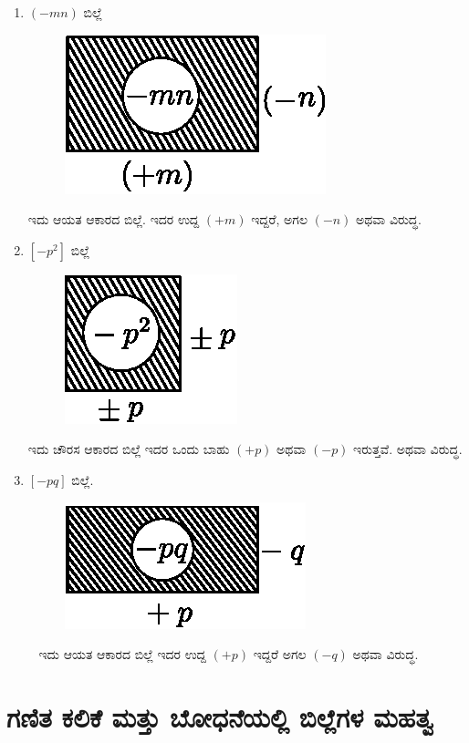 \begin{enumerate}
\item $(-mn)$ ಬಿಲ್ಲೆ 
\begin{figure}[H]
\centering
\includegraphics[scale=0.8]{src/figure/chap3/fig3-5d.eps}
\end{figure}
ಇದು ಆಯತ ಆಕಾರದ ಬಿಲ್ಲೆ. ಇದರ ಉದ್ದ $(+m)$ ಇದ್ದರೆ, ಅಗಲ $(-n)$ ಅಥವಾ ವಿರುದ್ಧ. 

\item $[-p^2]$ ಬಿಲ್ಲೆ 
\begin{figure}[H]
\centering
\includegraphics[scale=0.8]{src/figure/chap3/fig3-5e.eps}
\end{figure}
ಇದು ಚೌರಸ ಆಕಾರದ ಬಿಲ್ಲೆ ಇದರ ಒಂದು ಬಾಹು $(+p)$ ಅಥವಾ $(-p)$ ಇರುತ್ತವೆ. ಅಥವಾ ವಿರುದ್ಧ.

\item $[-pq]$ ಬಿಲ್ಲೆ. 
~
\vskip -0.3cm
\begin{figure}[H]
\centering
\includegraphics[scale=0.8]{src/figure/chap3/fig3-5f.eps}
\end{figure}
~
\vskip -0.3cm
ಇದು ಆಯತ ಆಕಾರದ ಬಿಲ್ಲೆ ಇದರ ಉದ್ದ $(+p)$ ಇದ್ದರೆ ಅಗಲ $(-q)$ ಅಥವಾ ವಿರುದ್ಧ. 
\end{enumerate}

\section*{ಗಣಿತ ಕಲಿಕೆ ಮತ್ತು ಬೋಧನೆಯಲ್ಲಿ ಬಿಲ್ಲೆಗಳ ಮಹತ್ವ}


